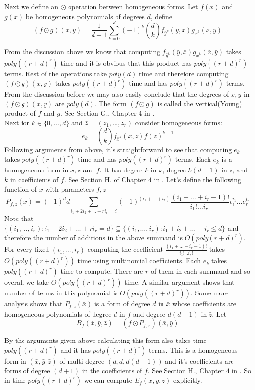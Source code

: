 \documentclass[12pt]{caltech_thesis}
\theoremstyle{plain}
\theoremstyle{definition}
\newcommand{\B}[1]{\bar{#1}}
\begin{document}
Next we define an $\odot$ operation between homogeneous forms. Let $f(\B{x})$ and $g(\B{x})$ be homogeneous polynomials
of degrees $d$, define
\[
(f\odot g)(\B{x},\B{y}) = \frac{1}{d+1}\sum\limits_{k=0}^d(-1)^k{d\choose k}f_{\B{y}^k}(\B{y},\B{x})g_{\B{x}^k}(\B{x},\B{y})
\]

From the discussion above we know that computing $f_{\B{y}^k}(\B{y},\B{x})g_{\B{x}^k}(\B{x},\B{y})$ takes $poly((r+d)^r)$
time and it is obvious that this product has $poly((r+d)^r)$ terms. Rest of the operations take $poly(d)$ time and therefore
computing $(f\odot g)(\B{x},\B{y})$ takes $poly((r+d)^r)$ time and has $poly((r+d)^r)$ terms. From the discussion before we may also
easily conclude that the degrees of $\B{x},\B{y}$ in $(f\odot g)(\B{x},\B{y})$ are $poly(d)$. The form $(f\odot g)$ is called the
vertical(Young) product of $f$ and $g$. See Section G., Chapter $4$ in \cite{GKZ94}.\\

Next for $k\in \{0,\ldots,d\}$ and $\B{z} = (z_1,\ldots,z_r)$ consider homogeneous forms:
\[
 e_k = {d\choose k}f_{\B{x}^k}(\B{x},\B{z})f(\B{z})^{k-1}
\]
Following arguments from above, it's straightforward to see that computing $e_k$ takes $poly((r+d)^r)$ time and
has $poly((r+d)^r)$ terms.
Each $e_k$ is a homogeneous form in $\B{x},\B{z}$ and $f$. It has degree $k$ in $\B{x}$, degree $k(d-1)$ in $z$, and $k$ in
coefficients of $f$. See Section H. of Chapter $4$ in \cite{GKZ94}. Let's define the following function of $\B{x}$ with parameters $f,z$
\[
 P_{f,z}(\B{x}) = (-1)^dd\sum\limits_{i_1+2i_2+\ldots+ri_r=d}(-1)^{(i_1+\ldots+i_r)}\frac{(i_1+\ldots+i_r-1)!}{i_1!\ldots i_r!}e_1^{i_1}\ldots e_r^{i_r
  }
\]
Note that $\{(i_1,\ldots,i_r) :i_1+2i_2+\ldots+ri_r=d\}\subseteq \{(i_1,\ldots,i_r) : i_1+i_2+\ldots+i_r\leq d\}$ and therefore
the number of additions in the above summand is $O(poly(r+d)^r)$. For every fixed $(i_1,\ldots,i_r)$ computing the
coefficient $\frac{(i_1+\ldots+i_r-1)!}{i_1!\ldots i_r!}$ takes $O(poly((r+d)^r))$ time using multinomial coefficients.
Each $e_k$ takes $poly((r+d)^r)$ time to compute. There are $r$ of them in each summand and so overall we take
$O(poly((r+d)^r))$ time. A similar argument shows that number of terms in this polynomial is $O(poly((r+d)^r))$. Some more
analysis shows that $P_{f,z}(\B{x})$ is a form of degree $d$ in $\B{x}$ whose coefficients are homogeneous polynomials
of degree $d$ in $f$ and degree $d(d-1)$ in $\B{z}$. Let
\[
 B_f({\B{x},\B{y},\B{z}}) = (f\odot P_{f,z})(\B{x},\B{y})
\]

By the arguments given above calculating this form also takes time $poly((r+d)^r)$ and it has $poly((r+d)^r)$ terms.
This is a homogeneous form in $(\B{x},\B{y},\B{z})$ of multi-degree $(d,d,d(d-1))$ and it's coefficients are forms
of degree $(d+1)$ in the coefficients of $f$. See Section H., Chapter $4$ in \cite{GKZ94}.
So in time $poly((r+d)^r)$ we can compute $B_f({\B{x},\B{y},\B{z}})$ explicitly.\\
\end{document}
